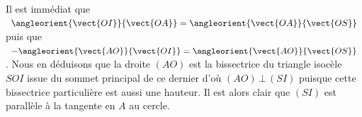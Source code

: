 \smallskip
\begin{center}
\end{center}
\smallskip

Il est immédiat que
$\angleorient{\vect{OI}}{\vect{OA}}
= \angleorient{\vect{OA}}{\vect{OS}}$
puis que
$- \angleorient{\vect{AO}}{\vect{OI}}
= \angleorient{\vect{AO}}{\vect{OS}}$ .
Nous en déduisons que la droite $(AO)$ est la bissectrice du triangle isocèle $SOI$  issue du sommet principal de ce dernier d'où $(AO) \,\bot\, (SI)$ puisque cette bissectrice particulière est aussi une hauteur. Il est alors clair que $(SI)$ est parallèle à la tangente en $A$ au cercle.
